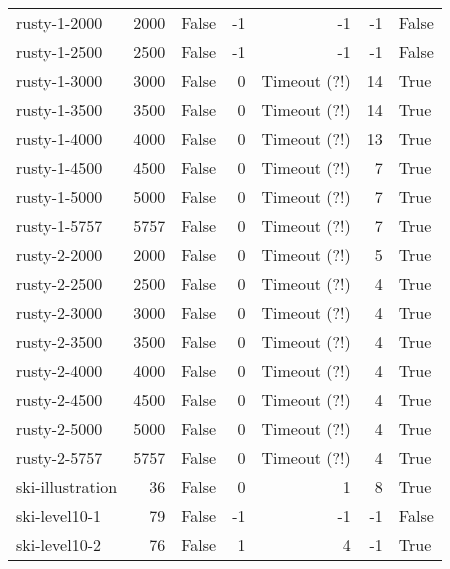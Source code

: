 \begin{longtable}{lrlrrrl}
rusty-1-2000 & 2000 & False & -1 & -1 & -1 & False \\

rusty-1-2500 & 2500 & False & -1 & -1 & -1 & False \\

rusty-1-3000 & 3000 & False & 0 & Timeout (?!) & 14 & True \\

rusty-1-3500 & 3500 & False & 0 & Timeout (?!) & 14 & True \\

rusty-1-4000 & 4000 & False & 0 & Timeout (?!) & 13 & True \\

rusty-1-4500 & 4500 & False & 0 & Timeout (?!) & 7 & True \\

rusty-1-5000 & 5000 & False & 0 & Timeout (?!) & 7 & True \\

rusty-1-5757 & 5757 & False & 0 & Timeout (?!) & 7 & True \\

rusty-2-2000 & 2000 & False & 0 & Timeout (?!) & 5 & True \\

rusty-2-2500 & 2500 & False & 0 & Timeout (?!) & 4 & True \\

rusty-2-3000 & 3000 & False & 0 & Timeout (?!) & 4 & True \\

rusty-2-3500 & 3500 & False & 0 & Timeout (?!) & 4 & True \\

rusty-2-4000 & 4000 & False & 0 & Timeout (?!) & 4 & True \\

rusty-2-4500 & 4500 & False & 0 & Timeout (?!) & 4 & True \\

rusty-2-5000 & 5000 & False & 0 & Timeout (?!) & 4 & True \\

rusty-2-5757 & 5757 & False & 0 & Timeout (?!) & 4 & True \\

ski-illustration & 36 & False & 0 & 1 & 8 & True \\

ski-level10-1 & 79 & False & -1 & -1 & -1 & False \\

ski-level10-2 & 76 & False & 1 & 4 & -1 & True \\


\end{longtable}
